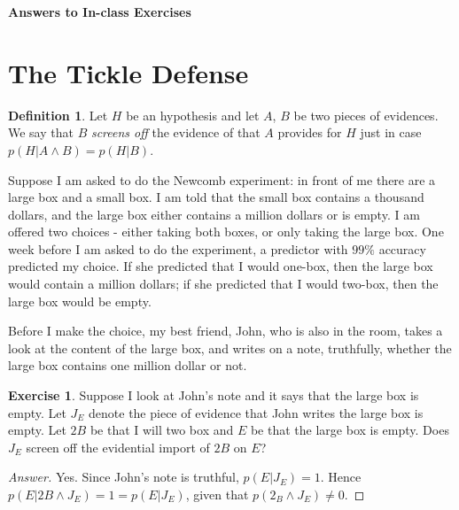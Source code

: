 \documentclass[11pt]{article}
\theoremstyle{definition}
\newtheorem{defn}{Definition}
\newtheorem{exer}{Exercise}
\begin{document}




\begin{center}
{\LARGE \bf Answers to In-class Exercises}
\end{center}

\smallskip

\section{The Tickle Defense}

\begin{defn}
Let $H$ be an hypothesis and let $A$, $B$ be two pieces of evidences. We say that $B$ \textit{screens off} the evidence of that $A$ provides for $H$ just in case $p(H | A \land B) = p(H | B)$.
\end{defn}


Suppose I am asked to do the Newcomb experiment: in front of me there are a large box and a small box. I am told that the small box contains a thousand dollars, and the large box either contains a million dollars or is empty. I am offered two choices - either taking both boxes, or only taking the large box. One week before I am asked to do the experiment, a predictor with $99\%$ accuracy predicted my choice. If she predicted that I would one-box, then the large box would contain a million dollars; if she predicted that I would two-box, then the large box would be empty.

Before I make the choice, my best friend, John, who is also in the room, takes a look at the content of the large box, and writes on a note, truthfully, whether the large box contains one million dollar or not.

\begin{exer}
Suppose I look at John's note and it says that the large box is empty. Let $J_E$ denote the piece of evidence that John writes the large box is empty. 
Let $2B$ be that I will two box and $E$ be that the large box is empty.
Does $J_E$ screen off the evidential import of $2B$ on $E$?
\end{exer}



\begin{proof}[Answer]
Yes. Since John's note is truthful, $p(E | J_E) = 1$. Hence $p(E | 2B \land J_E) = 1 = p(E | J_E) $, given that $p(2_B \land J_E) \neq 0$.

\end{proof}
\end{document}

